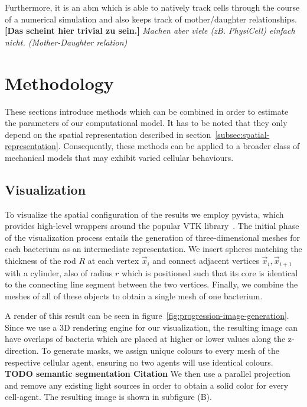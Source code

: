 \documentclass{article}
\begin{document}
Furthermore, it is an \ac{abm} which is able to natively track cells through the course of a
numerical simulation and also keeps track of mother/daughter relationships.
\textbf{[Das scheint hier trivial zu sein.]}
\textit{Machen aber viele (zB. PhysiCell) einfach nicht. (Mother-Daughter relation)}

\section{Methodology}
These sections introduce methods which can be combined in order to estimate the parameters of our
computational model.
It has to be noted that they only depend on the spatial representation described in
section~\ref{subsec:spatial-representation}.
Consequently, these methods can be applied to a broader class of mechanical models that may exhibit
varied cellular behaviours.

\subsection{Visualization}
\label{subsection:visualization}
To visualize the spatial configuration of the results we employ pyvista, which provides high-level
wrappers around the popular VTK library~\cite{vtkBook,Sullivan2019}.
The initial phase of the visualization process entails the generation of three-dimensional meshes
for each bacterium as an intermediate representation.
We insert spheres matching the thickness of the rod $R$ at each vertex $\vec{x}_i$ and connect
adjacent vertices $\vec{x}_i,\vec{x}_{i+1}$ with a cylinder, also of radius $r$ which is positioned
such that its core is identical to the connecting line segment between the two vertices.
Finally, we combine the meshes of all of these objects to obtain a single mesh of one bacterium.

A render of this result can be seen in figure~\ref{fig:progression-image-generation}.
Since we use a 3D rendering engine for our visualization, the resulting image can have
overlaps of bacteria which are placed at higher or lower values along the z-direction.
To generate masks, we assign unique colours to every mesh of the respective cellular agent, ensuring
no two agents will use identical colours. \textbf{TODO semantic segmentation Citation}
We then use a parallel projection and remove any existing light sources in order to obtain a solid
color for every cell-agent.
The resulting image is shown in subfigure (B).
\end{document}
